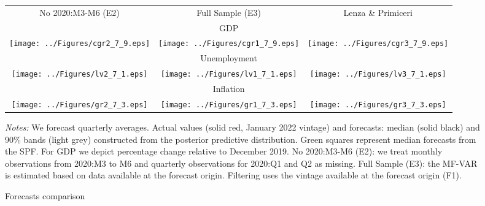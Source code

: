 \documentclass[11pt]{article}
\begin{document}
\begin{figure}[t!]	
	\caption{Forecasts comparison}
	\begin{center}	
			\begin{tabular}{ccc}	
				 {\footnotesize No 2020:M3-M6 (E2)}  &
				{\footnotesize Full Sample (E3)}  & {\footnotesize Lenza \& Primiceri}\\ [1ex]	
				 \multicolumn{3}{c}{GDP} \\[1ex]
				\texttt{[image: ../Figures/cgr2\_7\_9.eps]} &
				\texttt{[image: ../Figures/cgr1\_7\_9.eps]} &
				\texttt{[image: ../Figures/cgr3\_7\_9.eps]} \\[1ex]
				 \multicolumn{3}{c}{Unemployment} \\[1ex]		
				\texttt{[image: ../Figures/lv2\_7\_1.eps]} &
				\texttt{[image: ../Figures/lv1\_7\_1.eps]} &
				\texttt{[image: ../Figures/lv3\_7\_1.eps]} \\[1ex]
				 \multicolumn{3}{c}{Inflation} \\[1ex]	
				\texttt{[image: ../Figures/gr2\_7\_3.eps]} &
				\texttt{[image: ../Figures/gr1\_7\_3.eps]} &
				\texttt{[image: ../Figures/gr3\_7\_3.eps]} 
			\end{tabular}
	\end{center}
	{\footnotesize\emph{Notes:} We forecast quarterly averages. Actual values (solid red, January 2022 vintage) and forecasts: median (solid black) and 90\% bands (light grey) constructed from the posterior predictive distribution. Green squares represent median forecasts from the SPF. For GDP we depict percentage change relative to December 2019.  No 2020:M3-M6 (E2): we treat monthly observations from 2020:M3 to M6 and quarterly observations for 2020:Q1 and Q2 as missing. Full Sample (E3): the MF-VAR is estimated based on data available at the forecast origin. Filtering uses the vintage available at the forecast origin (F1).
	}\setlength{\baselineskip}{4mm}
\end{figure}
\end{document}
